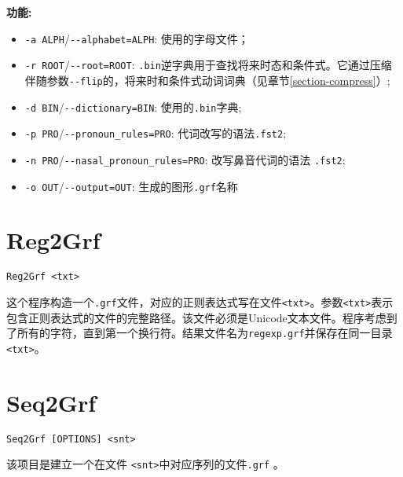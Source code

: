 \bigskip
\noindent \textbf{功能:}
\begin{itemize}
  \item \verb+-a ALPH+/\verb+--alphabet=ALPH+: 使用的字母文件；

  \item \verb+-r ROOT+/\verb+--root=ROOT+:
   \verb+.bin+逆字典用于查找将来时态和条件式。它通过压缩伴随参数\verb+--flip+的，将来时和条件式动词词典（见章节\ref{section-compress}）;
  
  \item \verb+-d BIN+/\verb+--dictionary=BIN+: 使用的\verb+.bin+字典;
  
  \item \verb+-p PRO+/\verb+--pronoun_rules=PRO+: 代词改写的语法\verb+.fst2+;

  \item \verb+-n PRO+/\verb+--nasal_pronoun_rules=PRO+: 改写鼻音代词的语法 \verb+.fst2+;

  \item \verb+-o OUT+/\verb+--output=OUT+: 生成的图形\verb+.grf+名称
\end{itemize}







\section{Reg2Grf}
\verb+Reg2Grf <txt>+

\bigskip
\noindent {} 
这个程序构造一个\verb+.grf+文件，对应的正则表达式写在文件\verb+<txt>+。参数\verb+<txt>+表示包含正则表达式的文件的完整路径。该文件必须是Unicode文本文件。程序考虑到了所有的字符，直到第一个换行符。结果文件名为\verb+regexp.grf+并保存在同一目录\verb+<txt>+。





\section{Seq2Grf}
\label{Seq2Grf}
\verb+Seq2Grf [OPTIONS] <snt>+

\bigskip
\noindent 该项目是建立一个在文件 \verb+<snt>+中对应序列的文件\verb+.grf+ 。

